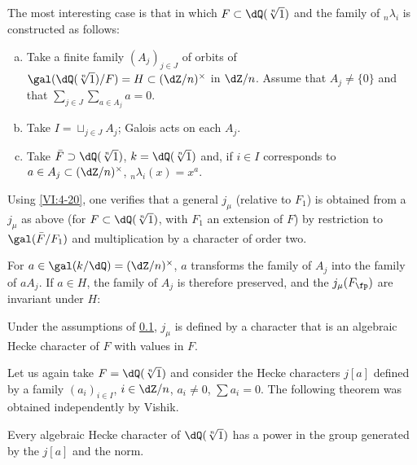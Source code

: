\documentclass[oneside]{book}
\begin{document}
\subsection{}\label{VI:6-9}

The most interesting case is that in which $F\subset \dQ(\sqrt[n]{1})$ and 
the family of $_n \lambda_i$ is constructed as follows: 
\begin{enumerate}[a)]
  \item Take a finite family $(A_j)_{j\in J}$ of orbits of 
    $\gal(\dQ(\sqrt[n]{1})/F)=H\subset (\dZ/n)^\times$ in $\dZ/n$. Assume that 
    $A_j\ne\{0\}$ and that $\sum_{j\in J} \sum_{a\in A_j} a=0$. 
  \item Take $I=\sqcup_{j\in J} A_j$; Galois acts on each $A_j$. 
  \item Take $\bar F\supset \dQ(\sqrt[n]{1})$, $k=\dQ(\sqrt[n]{1})$ and, if 
    $i\in I$ corresponds to $a\in A_j\subset (\dZ/n)^\times$, 
    $_n\lambda_i(x)=x^a$. 
\end{enumerate}

Using \ref{VI:4-20}, one verifies that a general $j_\mu$ (relative to 
$F_1$) is obtained from a $j_\mu$ as above (for 
$F\subset \dQ(\sqrt[n]{1})$, with $F_1$ an extension of $F$) by restriction to 
$\gal(\bar F/F_1)$ and multiplication by a character of order two. 

For $a\in \gal(k/\dQ)=(\dZ/n)^\times$, $a$ transforms the family of $A_j$ 
into the family of $a A_j$. If $a\in H$, the family of $A_j$ is therefore preserved, 
and the $j_\mu(F_\fp)$ are invariant under $H$: 





\begin{proposition_}\label{VI:6-10}
Under the assumptions of \ref{VI:6-9}, $j_\mu$ is defined by a character 
that is an algebraic Hecke character of $F$ with values in $F$. 
\end{proposition_}

Let us again take $F=\dQ(\sqrt[n]{1})$ and consider the Hecke characters 
$j[a]$ defined by a family $(a_i)_{i\in I}$, $i\in \dZ/n$, 
$a_i\ne 0$, $\sum a_i=0$. The following theorem was obtained 
independently by Vishik. 





\begin{theorem_}\label{VI:6-11}
Every algebraic Hecke character of $\dQ(\sqrt[n]{1})$ has a power 
in the group generated by the $j[a]$ and the norm. 
\end{theorem_}
\end{document}
